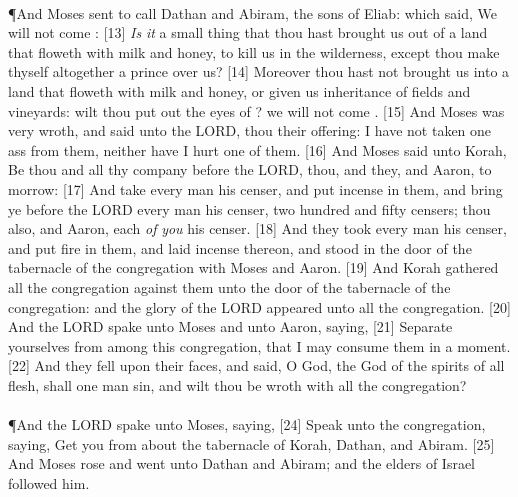 \\
\P \textcolor[cmyk]{0.99998,1,0,0}{And Moses sent to call Dathan and Abiram, the sons of Eliab: which said, We will not come :}
[13] \textcolor[cmyk]{0.99998,1,0,0}{\emph{Is} \emph{it} a small thing that thou hast brought us  out of a land that floweth with milk and honey, to kill us in the wilderness, except thou make thyself altogether a prince over us?}
[14] \textcolor[cmyk]{0.99998,1,0,0}{Moreover thou hast not brought us into a land that floweth with milk and honey, or given us inheritance of fields and vineyards: wilt thou put out the eyes of ? we will not come .}
[15] \textcolor[cmyk]{0.99998,1,0,0}{And Moses was very wroth, and said unto the LORD,  thou their offering: I have not taken one ass from them, neither have I hurt one of them.}
[16] \textcolor[cmyk]{0.99998,1,0,0}{And Moses said unto Korah, Be thou and all thy company before the LORD, thou, and they, and Aaron, to morrow:}
[17] \textcolor[cmyk]{0.99998,1,0,0}{And take every man his censer, and put incense in them, and bring ye before the LORD every man his censer, two hundred and fifty censers; thou also, and Aaron, each \emph{of} \emph{you} his censer.}
[18] \textcolor[cmyk]{0.99998,1,0,0}{And they took every man his censer, and put fire in them, and laid incense thereon, and stood in the door of the tabernacle of the congregation with Moses and Aaron.}
[19] \textcolor[cmyk]{0.99998,1,0,0}{And Korah gathered all the congregation against them unto the door of the tabernacle of the congregation: and the glory of the LORD appeared unto all the congregation.}
[20] \textcolor[cmyk]{0.99998,1,0,0}{And the LORD spake unto Moses and unto Aaron, saying,}
[21] \textcolor[cmyk]{0.99998,1,0,0}{Separate yourselves from among this congregation, that I may consume them in a moment.}
[22] \textcolor[cmyk]{0.99998,1,0,0}{And they fell upon their faces, and said, O God, the God of the spirits of all flesh, shall one man sin, and wilt thou be wroth with all the congregation?}\\
\\
\P \textcolor[cmyk]{0.99998,1,0,0}{And the LORD spake unto Moses, saying,}
[24] \textcolor[cmyk]{0.99998,1,0,0}{Speak unto the congregation, saying, Get you  from about the tabernacle of Korah, Dathan, and Abiram.}
[25] \textcolor[cmyk]{0.99998,1,0,0}{And Moses rose  and went unto Dathan and Abiram; and the elders of Israel followed him.}
